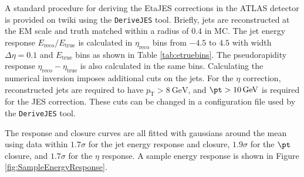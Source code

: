 \documentclass[NOTE, atlasdraft=true, texlive=2016, USenglish]{\ATLASLATEXPATH atlasdoc}
\begin{document}
A standard procedure for deriving the EtaJES corrections in the ATLAS detector is provided on twiki using the \texttt{DeriveJES} tool. Briefly, jets are reconstructed at the EM scale and truth matched within a radius of $0.4$ in MC. The jet energy response $E_{\text{reco}}/E_{\text{true}}$ is calculated in $\eta_{\text{reco}}$ bins from $-4.5$ to $4.5$ with width $\Delta\eta = 0.1$ and $E_{\text{true}}$ bins as shown in Table \ref{tab:etruebins}. The pseudorapidity response $\eta_{\text{reco}}-\eta_{\text{true}}$ is also calculated in the same bins. Calculating the numerical inversion imposes additional cuts on the jets. For the $\eta$ correction, reconstructed jets are required to have $p_{\text{T}} > \SI{8}{\GeV}$, and $\pt > \SI{10}{\GeV}$ is required for the JES correction. These cuts can be changed in a configuration file used by the \texttt{DeriveJES} tool.\par
The response and closure curves are all fitted with gaussians around the mean using data within $1.7\sigma$ for the jet energy response and closure, $1.9\sigma$ for the $\pt$ closure, and $1.7\sigma$ for the $\eta$ response. A sample energy response is shown in Figure \ref{fig:SampleEnergyResponse}.
\begin{center}
\begin{table}
\caption{$E_{\text{true}}$ bin edges used in deriving the EtaJES corrections.}
\label{tab:etruebins}
\end{table}
\end{center}
\end{document}
